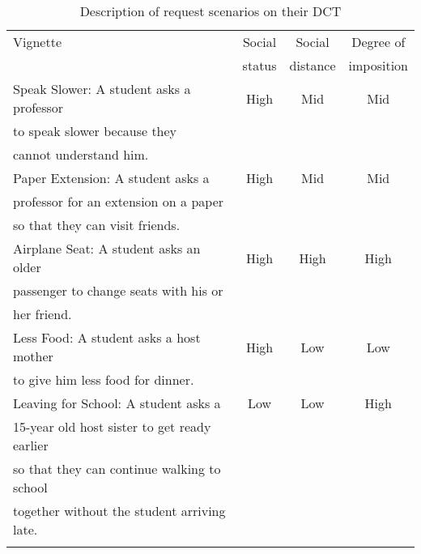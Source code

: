 \documentclass[output=paper]{langscibook}
\begin{document}
\begin{table}
	\begin{tabular}{lccc}
		\lsptoprule
		Vignette & Social & Social & Degree of \\
				 & status & distance & imposition \\
\midrule
		Speak Slower: A student asks a professor     & High & Mid & Mid \\
		to speak slower because they            & & & \\
		cannot understand him.					     & & & \\
\tablevspace
		Paper Extension: A student asks a            & High & Mid & Mid \\
		professor for an extension on a paper        & & & \\
		so that they can visit friends.         & & & \\
\tablevspace
		Airplane Seat: A student asks an older       & High & High & High \\
		passenger to change seats with his or	     & & & \\
		her friend.								     & & & \\
\tablevspace
		Less Food: A student asks a host mother      & High & Low & Low \\
		to give him less food for dinner.		     & & & \\
\tablevspace
		Leaving for School: A student asks a         & Low & Low & High \\
		15-year old host sister to get ready earlier & & & \\
		so that they can continue walking to school  & & & \\
		together without the student arriving late.  & & & \\
		\lspbottomrule
	\end{tabular}
	\caption{Description of  request scenarios on their DCT}
	\label{tab:4:1}
\end{table}
\end{document}
